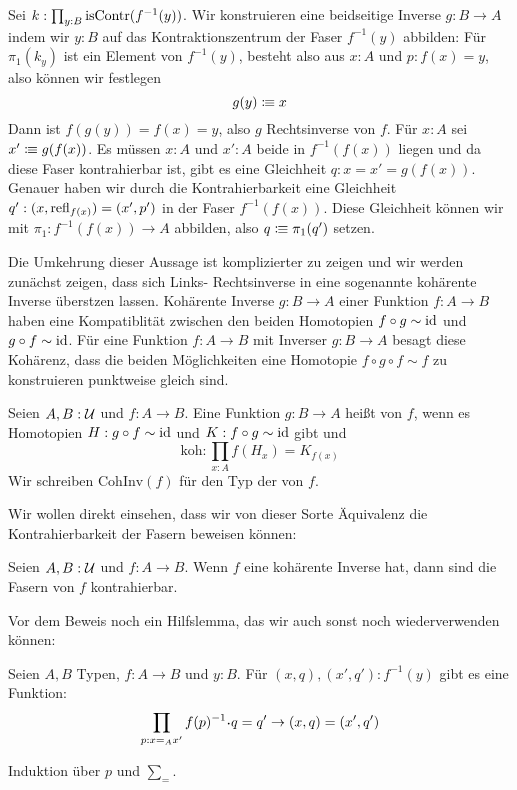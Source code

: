 \begin{beweis}
  Sei $k:\prod_{y:B}\mathrm{isContr}(f^{-1}(y))$.
  Wir konstruieren eine beidseitige Inverse $g:B\to A$ indem wir $y:B$ auf das Kontraktionszentrum der Faser $f^{-1}(y)$ abbilden:
  Für $\pi_1(k_y)$ ist ein Element von $f^{-1}(y)$, besteht also aus $x:A$ und $p:f(x)=y$, also können wir festlegen
  \[
    g(y)\vcentcolon\mspace{-1.2mu}\equiv x
  \]
  Dann ist $f(g(y))=f(x)=y$, also $g$ Rechtsinverse von $f$. Für $x:A$ sei $x'\vcentcolon\mspace{-1.2mu}\equiv g(f(x))$.
  Es müssen $x:A$ und $x':A$ beide in $f^{-1}(f(x))$ liegen und da diese Faser kontrahierbar ist, gibt es eine Gleichheit $q:x=x'=g(f(x))$.
  Genauer haben wir durch die Kontrahierbarkeit eine Gleichheit $q':(x,\mathrm{refl}_{f(x)})=(x',p')$ in der Faser $f^{-1}(f(x))$.
  Diese Gleichheit können wir mit $\pi_1:f^{-1}(f(x))\to A$ abbilden, also $q\vcentcolon\mspace{-1.2mu}\equiv \pi_1(q')$ setzen.
\end{beweis}

Die Umkehrung dieser Aussage ist komplizierter zu zeigen und wir werden zunächst zeigen, dass sich Links- Rechtsinverse in eine sogenannte kohärente Inverse überstzen lassen.
Kohärente Inverse $g:B\to A$ einer Funktion $f:A\to B$ haben eine Kompatiblität zwischen den beiden Homotopien $f\circ g\sim \mathrm{id}$ und $g\circ f\sim \mathrm{id}$.
Für eine Funktion $f:A\to B$ mit Inverser $g:B\to A$ besagt diese Kohärenz, dass die beiden Möglichkeiten eine Homotopie $f\circ g\circ f\sim f$ zu konstruieren punktweise gleich sind.

\begin{definition}
  Seien $A,B:\mathcal{U}$ und $f:A\to B$.
  Eine Funktion $g:B\to A$ heißt  von $f$, wenn es Homotopien $H:g\circ f\sim \mathrm{id}$ und $K:f\circ g \sim \mathrm{id}$ gibt und
  \[
    \mathrm{koh} : \prod_{x:A}f(H_x)=K_{f(x)}
  \]
  Wir schreiben $\mathrm{CohInv}(f)$ für den Typ der  von $f$.
\end{definition}

Wir wollen direkt einsehen, dass wir von dieser Sorte Äquivalenz die Kontrahierbarkeit der Fasern beweisen können:

\begin{bemerkung}
  \label{bem:qinv-equiv}
  Seien $A,B:\mathcal{U}$ und $f:A\to B$. Wenn $f$ eine kohärente Inverse hat, dann sind die Fasern von $f$ kontrahierbar.
\end{bemerkung}
Vor dem Beweis noch ein Hilfslemma, das wir auch sonst noch wiederverwenden können:
\begin{lemma}
  \label{lem:gleichheit-in-faser}
  Seien $A,B$ Typen, $f:A\to B$ und $y:B$. Für $(x,q),(x',q'):f^{-1}(y)$ gibt es eine Funktion:
  \[
    \prod_{p:x=_A x'}f(p)^{-1}\kon q=q'\to (x,q)=(x',q')
  \]
\end{lemma}
\begin{beweis}
  Induktion über $p$ und $\sum_=$.
\end{beweis}

